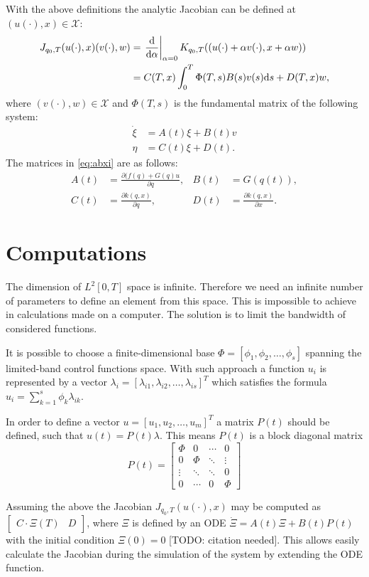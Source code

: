 With the above definitions the analytic Jacobian can be defined at $(u(\cdot), x) \in \mathcal{X}$:
\begin{align}
J_{q_0, T}(u(\cdot), x)(v(\cdot), w) &= \left.\frac{\mathrm{d}}{\mathrm{d} \alpha}\right|_{\alpha=0} K_{q_0, T}((u(\cdot)+\alpha v(\cdot), x+\alpha w))\\
 &= C(T,x)\int_0^T \Phi(T,s)B(s)v(s)\mathrm{d} s + D(T,x)w,
\end{align}
where $(v(\cdot), w)\in \mathcal{X}$ and $\Phi(T,s)$ is the fundamental matrix of the following system:
\begin{equation}
\begin{aligned}
\label{eq:abxi}
\dot \xi &= A(t)\xi + B(t) v \\
\eta &= C(t)\xi + D(t).
\end{aligned}
\end{equation}
The matrices in \eqref{eq:abxi} are as follows:
\begin{equation}
\begin{aligned}
A(t) &= \frac{\partial (f(q)+G(q)u}{\partial q}, & B(t) &= G(q(t)),\\
C(t) &= \frac{\partial k(q, x)}{\partial q}, & D(t) &= \frac{\partial k(q, x)}{\partial x}.
\end{aligned}
\end{equation}

\section{Computations}
The dimension of $L^2[0,T]$ space is infinite. Therefore we need an infinite number of parameters to define an element from this space. This is impossible to achieve in calculations made on a computer. The solution is to limit the bandwidth of considered functions. 

It is possible to choose a finite-dimensional base $\Phi = [ \phi_1, \phi_2, \dots, \phi_s ]$ spanning the limited-band control functions space. 
With such approach a function $u_i$ is represented by a vector 
$\lambda_i = [\lambda_{i1}, \lambda_{i2}, \dots, \lambda_{is}]^T$ 
which satisfies the formula $u_i = \sum_{k=1}^s \phi_k \lambda_{ik}$.

In order to define a vector $u=[u_1, u_2, \dots, u_m]^T$ a matrix $P(t)$ should be defined, such that $u(t)=P(t)\lambda$. This means $P(t)$ is a block diagonal matrix 
\begin{equation}
P(t)=\begin{bmatrix}
\Phi & 0 & \cdots & 0\\
0 & \Phi & \ddots & \vdots\\
\vdots & \ddots & \ddots & 0 \\
0 &  \cdots & 0 & \Phi
\end{bmatrix}
\end{equation}

Assuming the above the Jacobian $J_{q_0, T}(u(\cdot), x)$ may be computed as $\begin{bmatrix}
C\cdot\Xi(T)& D
\end{bmatrix}$, where $\Xi$ is defined by an ODE $\dot \Xi = A(t)\Xi +B(t)P(t)$ with the initial condition $\Xi(0)=0$ [TODO: citation needed]. This allows easily calculate the Jacobian during the simulation of the system by extending the ODE function.
